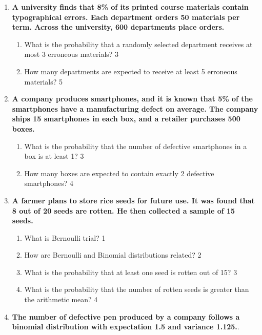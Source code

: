 \documentclass[a4paper,oneside]{book}
\begin{document}
\begin{enumerate}
  
  \item  
  \textbf{A university finds that 8\% of its printed course materials contain typographical errors. Each department orders 50 materials per term. Across the university, 600 departments place orders.}  

  \begin{enumerate}  
    \item  
      What is the probability that a randomly selected department receives at most 3 erroneous materials? \hfill 3  
    \item  
      How many departments are expected to receive at least 5 erroneous materials? \hfill 5  
  \end{enumerate}

  
  \item
	  \textbf{A company produces smartphones, and it is known that 5\% of the 
	  smartphones have a manufacturing defect on average. The company ships 15 
	  smartphones in each box, and a retailer purchases 500 boxes.} 
  
  \begin{enumerate}
    \item  
	What is the probability that the number of defective smartphones in a box 
	is at least 1? \hfill 3
    \item
	How many boxes are expected to contain exactly 2 defective smartphones? \hfill 4
  \end{enumerate}

  
 \item
	  \textbf{A farmer plans to store rice seeds for future use. It was found 
	  that 8 out of 20 seeds are rotten. He then collected a sample of 15 seeds.} 
  
  \begin{enumerate}
    \item
	What is Bernoulli trial? \hfill 1
    \item
	How are Bernoulli and Binomial distributions related? \hfill 2
    \item  
	What is the probability that at least one seed is rotten out of 15? \hfill 3
    \item
	What is the probability that the number of rotten seeds is greater than the arithmetic mean? \hfill 4
  \end{enumerate}

 \item
	  \textbf{The number of defective pen produced by a company follows a 
	  binomial distribution with expectation 1.5 and variance 1.125.}. 
  

\end{enumerate}
\end{document}
